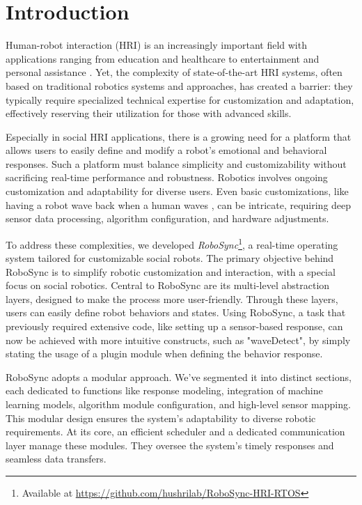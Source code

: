 \documentclass[runningheads]{llncs}
\begin{document}
\section{Introduction}

Human-robot interaction (HRI) is an increasingly important field with applications ranging from education \cite{deSouzaJeronimo2022} and healthcare \cite{PintoBernal2022} to entertainment \cite{Park2015} and personal assistance \cite{Ringwald2023}. Yet, the complexity of state-of-the-art HRI systems, often based on traditional robotics systems and approaches, has created a barrier: they typically require specialized technical expertise for customization and adaptation, effectively reserving their utilization for those with advanced skills.

Especially in social HRI applications, there is a growing need for a  platform that allows users to easily define and modify a robot's emotional and behavioral responses. Such a platform must balance simplicity and customizability without sacrificing real-time performance and robustness. 
Robotics involves ongoing customization and adaptability for diverse users. Even basic customizations, like having a robot wave back when a human waves \cite{Canal2016}, can be intricate, requiring deep sensor data processing, algorithm configuration, and hardware adjustments.

To address these complexities, we developed \textit{RoboSync}\footnote{Available at \href{https://github.com/hushrilab/RoboSync-HRI-RTOS}{https://github.com/hushrilab/RoboSync-HRI-RTOS}}, a real-time operating system tailored for customizable social robots. The primary objective behind RoboSync is to simplify robotic customization and interaction, with a special focus on social robotics. Central to RoboSync are its multi-level abstraction layers, designed to make the process more user-friendly. Through these layers, users can easily define robot behaviors and states. Using RoboSync, a task that previously required extensive code, like setting up a sensor-based response, can now be achieved with more intuitive constructs, such as "waveDetect", by simply stating the usage of a plugin module when defining the behavior response.

RoboSync adopts a modular approach. We've segmented it into distinct sections, each dedicated to functions like response modeling, integration of machine learning models, algorithm module configuration, and high-level sensor mapping. This modular design ensures the system's adaptability to diverse robotic requirements. At its core, an efficient scheduler and a dedicated communication layer manage these modules. They oversee the system's timely responses and seamless data transfers.
\end{document}
